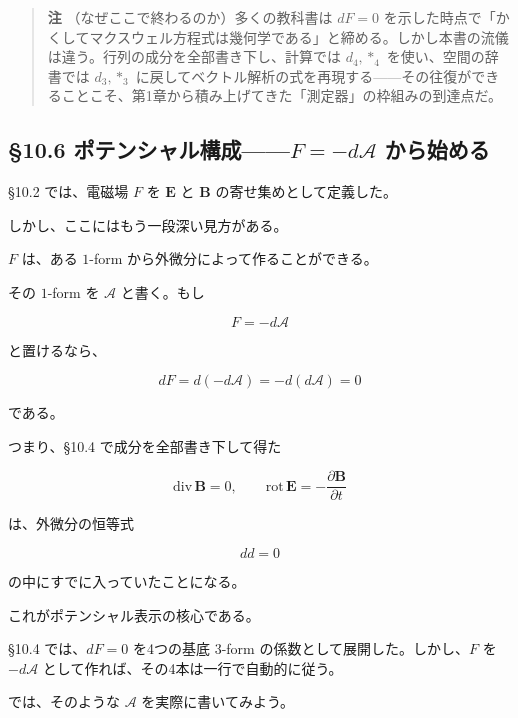 \documentclass[a4paper,12pt,openany]{book}
\begin{document}
\begin{quote}
\textbf{注} （なぜここで終わるのか）多くの教科書は \(dF=0\)
を示した時点で「かくしてマクスウェル方程式は幾何学である」と締める。しかし本書の流儀は違う。行列の成分を全部書き下し、計算では
\(d_4,\ast_4\) を使い、空間の辞書では \(d_3,\ast_3\)
に戻してベクトル解析の式を再現する——その往復ができることこそ、第1章から積み上げてきた「測定器」の枠組みの到達点だ。
\end{quote}

\par\vspace{0.35em}\par

\hypertarget{ux30ddux30c6ux30f3ux30b7ux30e3ux30ebux69cbux6210f-dmathcala-ux304bux3089ux59cbux3081ux308b}{%
\subsection{\texorpdfstring{§10.6
ポテンシャル構成——\(F=-d\mathcal{A}\)
から始める}{§10.6 ポテンシャル構成——F=-d\textbackslash mathcal\{A\} から始める}}\label{ux30ddux30c6ux30f3ux30b7ux30e3ux30ebux69cbux6210f-dmathcala-ux304bux3089ux59cbux3081ux308b}}

§10.2 では、電磁場 \(F\) を \(\mathbf{E}\) と \(\mathbf{B}\)
の寄せ集めとして定義した。

しかし、ここにはもう一段深い見方がある。

\(F\) は、ある \(1\)-form から外微分によって作ることができる。

その \(1\)-form を \(\mathcal{A}\) と書く。もし

\[
F=-d\mathcal{A}
\]

と置けるなら、

\[
dF
=
d(-d\mathcal{A})
=
-d(d\mathcal{A})
=
0
\]

である。

つまり、§10.4 で成分を全部書き下して得た

\[
\mathrm{div}\,\mathbf{B}=0,
\qquad
\mathrm{rot}\,\mathbf{E}
=
-\frac{\partial\mathbf{B}}{\partial t}
\]

は、外微分の恒等式

\[
dd=0
\]

の中にすでに入っていたことになる。

これがポテンシャル表示の核心である。

§10.4 では、\(dF=0\) を4つの基底 \(3\)-form
の係数として展開した。しかし、\(F\) を \(-d\mathcal{A}\)
として作れば、その4本は一行で自動的に従う。

では、そのような \(\mathcal{A}\) を実際に書いてみよう。
\end{document}
